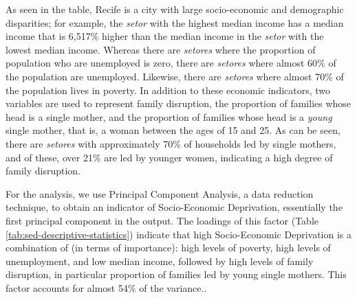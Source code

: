 \documentclass[smallextended]{svjour3}       %
\begin{document}
As seen in the table, Recife is a city with large socio-economic and
demographic disparities; for example, the \emph{setor} with the highest
median income has a median income that is 6,517\% higher than the median
income in the \emph{setor} with the lowest median income. Whereas there
are \emph{setores} where the proportion of population who are unemployed
is zero, there are \emph{setores} where almost 60\% of the population
are unemployed. Likewise, there are \emph{setores} where almost 70\% of
the population lives in poverty. In addition to these economic
indicators, two variables are used to represent family disruption, the
proportion of families whose head is a single mother, and the proportion
of families whose head is a \emph{young} single mother, that is, a woman
between the ages of 15 and 25. As can be seen, there are \emph{setores}
with approximately 70\% of households led by single mothers, and of
these, over 21\% are led by younger women, indicating a high degree of
family disruption.

For the analysis, we use Principal Component Analysis, a data reduction
technique, to obtain an indicator of Socio-Economic Deprivation,
essentially the first principal component in the output. The loadings of
this factor (Table \ref{tab:sed-descriptive-statistics}) indicate that
high Socio-Economic Deprivation is a combination of (in terms of
importance): high levels of poverty, high levels of unemployment, and
low median income, followed by high levels of family disruption, in
particular proportion of families led by young single mothers. This
factor accounts for almost 54\% of the variance..
\end{document}
